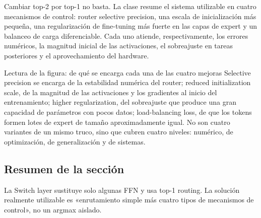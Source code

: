 
Cambiar top-2 por top-1 no basta. La clase resume el sistema utilizable en cuatro mecanismos de control: router selective precision, una escala de inicialización más pequeña, una regularización de fine-tuning más fuerte en las capas de expert y un balanceo de carga diferenciable. Cada uno atiende, respectivamente, los errores numéricos, la magnitud inicial de las activaciones, el sobreajuste en tareas posteriores y el aprovechamiento del hardware.


\begin{knowledgebox}{Lectura de la figura: de qué se encarga cada una de las cuatro mejoras}
Selective precision se encarga de la estabilidad numérica del router; reduced initialization scale, de la magnitud de las activaciones y los gradientes al inicio del entrenamiento; higher regularization, del sobreajuste que produce una gran capacidad de parámetros con pocos datos; load-balancing loss, de que los tokens formen lotes de expert de tamaño aproximadamente igual. No son cuatro variantes de un mismo truco, sino que cubren cuatro niveles: numérico, de optimización, de generalización y de sistemas.
\end{knowledgebox}

\subsection{Resumen de la sección}

La Switch layer sustituye solo algunas FFN y usa top-1 routing. La solución realmente utilizable es «enrutamiento simple más cuatro tipos de mecanismos de control», no un argmax aislado.
